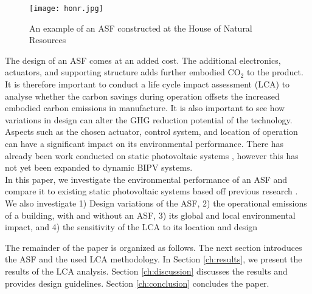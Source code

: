 \begin{figure}[H]
\begin{center}
\texttt{[image: honr.jpg]}
\caption{An example of an ASF constructed at the House of Natural Resources \cite{nagy2015frontiers}}
\label{fig:HoNR}
\end{center}
\end{figure}

The design of an ASF comes at an added cost. The additional electronics, actuators, and supporting structure adds further embodied CO$_2$ to the product. It is therefore important to conduct a life cycle impact assessment (LCA) to analyse whether the carbon savings during operation offsets the increased embodied carbon emissions in manufacture. It is also important to see how variations in design can alter the GHG reduction potential of the technology. Aspects such as the chosen actuator, control system, and location of operation can have a significant impact on its environmental performance. There has already been work conducted on static photovoltaic systems \cite{raugei2007life}, however this has not yet been expanded to dynamic BIPV systems. \\

In this paper, we investigate the environmental performance of an ASF and compare it to existing static photovoltaic systems based off previous research \cite{raugei2007life}. We also investigate 1) Design variations of the ASF, 2) the operational emissions of a building, with and without an ASF, 3) its global and local environmental impact, and 4) the sensitivity of the LCA to its location and design



The remainder of the paper is organized as follows. The next section introduces the ASF and the used LCA methodology. In Section \ref{ch:results}, we present the results of the LCA analysis. Section \ref{ch:discussion} discusses the results and provides design guidelines. Section \ref{ch:conclusion} concludes the paper.


